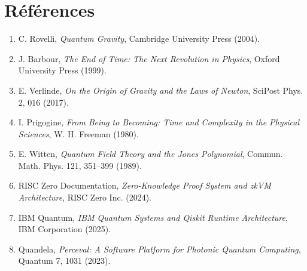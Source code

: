 \documentclass[12pt,a4paper]{article}
\begin{document}
\section*{Références}
\begin{enumerate}
    \item C. Rovelli, \textit{Quantum Gravity}, Cambridge University Press (2004).
    \item J. Barbour, \textit{The End of Time: The Next Revolution in Physics}, Oxford University Press (1999).
    \item E. Verlinde, \textit{On the Origin of Gravity and the Laws of Newton}, SciPost Phys. 2, 016 (2017).
    \item I. Prigogine, \textit{From Being to Becoming: Time and Complexity in the Physical Sciences}, W. H. Freeman (1980).
    \item E. Witten, \textit{Quantum Field Theory and the Jones Polynomial}, Commun. Math. Phys. 121, 351--399 (1989).
    \item RISC Zero Documentation, \textit{Zero-Knowledge Proof System and zkVM Architecture}, RISC Zero Inc. (2024).
    \item IBM Quantum, \textit{IBM Quantum Systems and Qiskit Runtime Architecture}, IBM Corporation (2025).
    \item Quandela, \textit{Perceval: A Software Platform for Photonic Quantum Computing}, Quantum 7, 1031 (2023).
\end{enumerate}
\end{document}
